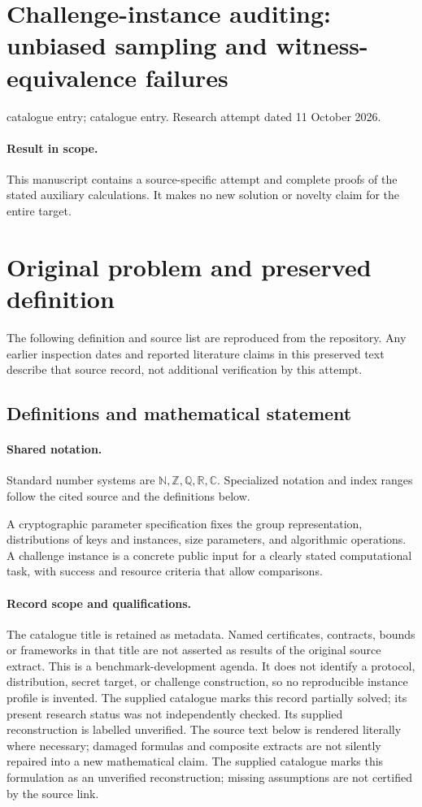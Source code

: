 \documentclass[11pt]{article}
\begin{document}
\section*{Challenge-instance auditing: unbiased sampling and witness-equivalence failures}
\noindent catalogue entry; catalogue entry. Research attempt dated 11 October 2026.
\paragraph{Result in scope.}This manuscript contains a source-specific attempt and complete proofs of the stated auxiliary calculations. It makes no new solution or novelty claim for the entire target.
\section{Original problem and preserved definition}
The following definition and source list are reproduced from the repository. Any earlier inspection dates and reported literature claims in this preserved text describe that source record, not additional verification by this attempt.
\subsection{Definitions and mathematical statement}

\paragraph{Shared notation.}Standard number systems are $\mathbb N,\mathbb Z,\mathbb Q,\mathbb R,\mathbb C$. Specialized notation and index ranges follow the cited source and the definitions below.


A cryptographic parameter specification fixes the group representation, distributions of keys and instances, size parameters, and algorithmic operations. A challenge instance is a concrete public input for a clearly stated computational task, with success and resource criteria that allow comparisons.
\paragraph{Record scope and qualifications.}
The catalogue title is retained as metadata. Named certificates, contracts, bounds or frameworks in that title are not asserted as results of the original source extract.
This is a benchmark-development agenda. It does not identify a protocol, distribution, secret target, or challenge construction, so no reproducible instance profile is invented. The supplied catalogue marks this record partially solved; its present research status was not independently checked. Its supplied reconstruction is labelled unverified.
The source text below is rendered literally where necessary; damaged formulas and composite extracts are not silently repaired into a new mathematical claim.
The supplied catalogue marks this formulation as an unverified reconstruction; missing assumptions are not certified by the source link.
\end{document}
